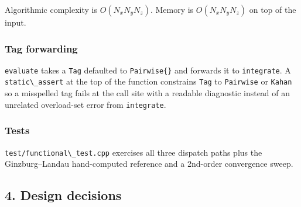 Algorithmic complexity is \(O(N_x N_y N_z)\). Memory is
\(O(N_x N_y N_z)\) on top of the input.

\subsubsection{Tag forwarding}\label{tag-forwarding}

\passthrough{\lstinline!evaluate!} takes a \passthrough{\lstinline!Tag!}
defaulted to \passthrough{\lstinline!Pairwise\{\}!} and forwards it to
\passthrough{\lstinline!integrate!}. A
\passthrough{\lstinline!static\_assert!} at the top of the function
constrains \passthrough{\lstinline!Tag!} to
\passthrough{\lstinline!Pairwise!} or \passthrough{\lstinline!Kahan!} so
a misspelled tag fails at the call site with a readable diagnostic
instead of an unrelated overload-set error from
\passthrough{\lstinline!integrate!}.

\subsubsection{Tests}\label{tests}

\passthrough{\lstinline!test/functional\_test.cpp!} exercises all three
dispatch paths plus the Ginzburg--Landau hand-computed reference and a
2nd-order convergence sweep.

\subsection{4. Design decisions}\label{design-decisions}

